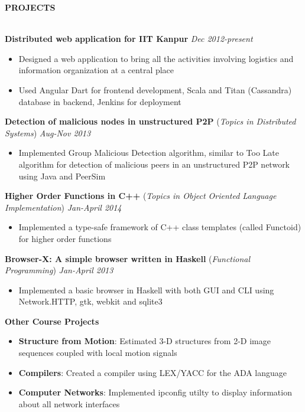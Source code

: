 \documentclass[10pt]{article}
\newcommand{\cvsectiontitle}[1]{
    		\colorbox{gray!40}{%
        \begin{minipage}{0.989\linewidth}%
            \vspace*{1pt}%
            \large\indent\textbf{#1}
            \vspace*{1pt}%
        \end{minipage}%
   		}\\[1mm]
		}
\begin{document}
\cvsectiontitle{PROJECTS}
\textbf{Distributed web application for IIT Kanpur} \hfill \textit{Dec 2012-present}
\vspace{-0.2cm}
\begin{itemize}
\setlength{\itemsep}{0.1mm}
	\item Designed a web application to bring all the activities involving logistics and information organization at a central place
	\item Used Angular Dart for frontend development, Scala and Titan (Cassandra) database in backend, Jenkins for deployment
\end{itemize}
\textbf{Detection of malicious nodes in unstructured P2P} (\textit{Topics in Distributed Systems}) \hfill \textit{Aug-Nov 2013}
\vspace{-0.2cm}
\begin{itemize}
	\item Implemented Group Malicious Detection algorithm, similar to Too Late algorithm for detection of malicious peers in an unstructured P2P network using Java and PeerSim
\end{itemize}
\textbf{Higher Order Functions in C++} (\textit{Topics in Object Oriented Language Implementation}) \hfill \textit{Jan-April 2014}
\vspace{-0.2cm}
\begin{itemize}
	\item Implemented a type-safe framework of C++ class templates (called Functoid) for higher order functions
\end{itemize}
\textbf{Browser-X: A simple browser written in Haskell} (\textit{Functional Programming}) \hfill \textit{Jan-April 2013}
\vspace{-0.2cm}
\begin{itemize}
	\item Implemented a basic browser in Haskell with both GUI and CLI using Network.HTTP, gtk, webkit and sqlite3
\end{itemize}
\textbf{Other Course Projects}
\vspace{-0.2cm}
\begin{itemize}
\setlength{\itemsep}{0.1mm}
\item \textbf{Structure from Motion}: Estimated 3-D structures from 2-D image sequences coupled with local motion signals
\item \textbf{Compilers}: Created a compiler using LEX/YACC for the ADA language
\item \textbf{Computer Networks}: Implemented ipconfig utilty to display information about all network interfaces
\end{itemize}
\end{document}
